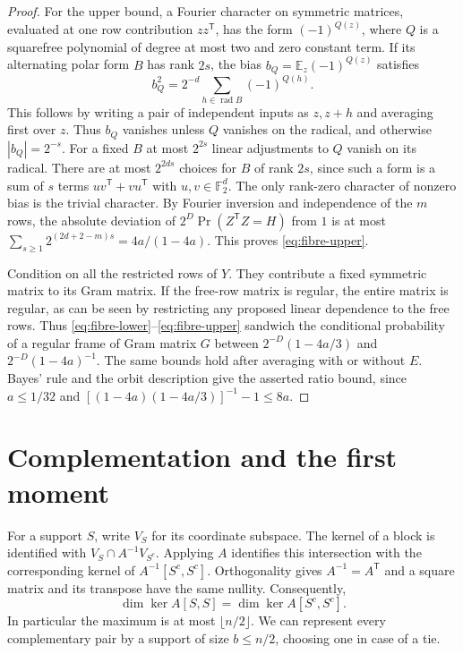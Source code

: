 \documentclass[11pt]{article}
\theoremstyle{remark}\newtheorem*{remark}{Remark}
\begin{document}
\begin{proof}
For the upper bound, a Fourier character on symmetric matrices,
evaluated at one row contribution $zz^{\mathsf T}$, has the form
$(-1)^{Q(z)}$, where $Q$ is a squarefree polynomial of degree at most
two and zero constant term. If its alternating polar form $B$ has
rank $2s$, the bias $b_Q=\mathbb E_z(-1)^{Q(z)}$ satisfies
\[
 b_Q^2=2^{-d}\sum_{h\in\operatorname{rad}B}(-1)^{Q(h)}.
\]
This follows by writing a pair of independent inputs as $z,z+h$ and
averaging first over $z$. Thus $b_Q$ vanishes unless $Q$ vanishes on
the radical, and otherwise $|b_Q|=2^{-s}$. For a fixed $B$ at most
$2^{2s}$ linear adjustments to $Q$ vanish on its radical. There are at
most $2^{2ds}$ choices for $B$ of rank $2s$, since such a form is a sum
of $s$ terms $uv^{\mathsf T}+vu^{\mathsf T}$ with $u,v\in\mathbb F_2^d$.
The only rank-zero character of nonzero bias is the trivial character.
By Fourier inversion and independence of the $m$ rows, the absolute
deviation of $2^D\Pr(Z^{\mathsf T}Z=H)$ from $1$ is at most
$\sum_{s\ge1}2^{(2d+2-m)s}=4a/(1-4a)$. This proves
\eqref{eq:fibre-upper}.

Condition on all the restricted rows of $Y$. They contribute a fixed
symmetric matrix to its Gram matrix. If the free-row matrix is regular,
the entire matrix is regular, as can be seen by restricting any proposed
linear dependence to the free rows. Thus
\eqref{eq:fibre-lower}--\eqref{eq:fibre-upper} sandwich the conditional
probability of a regular frame of Gram matrix $G$ between
$2^{-D}(1-4a/3)$ and $2^{-D}(1-4a)^{-1}$. The same bounds hold after
averaging with or without $E$. Bayes' rule and the orbit description
give the asserted ratio bound, since $a\le1/32$ and
$[(1-4a)(1-4a/3)]^{-1}-1\le8a$.
\end{proof}

\section{Complementation and the first moment}\label{sec:upper}
For a support $S$, write $V_S$ for its coordinate subspace. The kernel of a block is identified with $V_S\cap A^{-1}V_{S^c}$. Applying $A$ identifies this intersection with the corresponding kernel of $A^{-1}[S^c,S^c]$. Orthogonality gives $A^{-1}=A^{\mathsf T}$ and a square matrix and its transpose have the same nullity. Consequently,
\begin{equation}\label{eq:comp}
 \dim\ker A[S,S]=\dim\ker A[S^c,S^c].
\end{equation}
In particular the maximum is at most $\lfloor n/2\rfloor$. We can represent every complementary pair by a support of size $b\le n/2$, choosing one in case of a tie.
\end{document}
